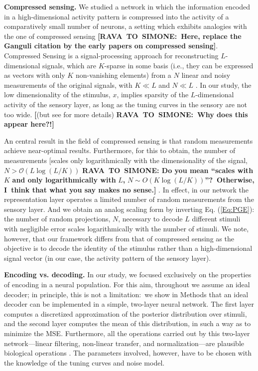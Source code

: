\documentclass[a4paper]{article}%
\begin{document}
\textbf{Compressed sensing.} We studied a network in which the information
encoded in a high-dimensional activity pattern is compressed into the activity
of a comparatively small number of neurons, a setting which exhibits analogies
with the one of compressed sensing \textbf{[RAVA\ TO\ SIMONE:\ Here, replace
the Ganguli citation by the early papers on compressed sensing]}. Compressed
Sensing is a signal-processing approach for reconstructing $L$-dimensional
signals, which are $K$-sparse in some basis (i.e., they can be expressed as
vectors with only $K$ non-vanishing elements) from a $N$ linear and noisy
measurements of the original signals, with $K\ll L$ and $N\ll L$
\cite{Donoho2006CompressedSensing}. In our study, the low dimensionality of
the stimulus, $x$, implies sparsity of the $L$-dimensional activity of the
sensory layer, as long as the tuning curves in the sensory are not too wide.
\textbf{[}(but see \cite{Baraniuk2009RandomManifolds} for more details)
\textbf{RAVA\ TO\ SIMONE:\ Why does this appear here?!]} 

An central result in the field of compressed sensing is that random
measurements achieve near-optimal results. Furthermore, for this to obtain,
the number of measurements [scales only logarithmically with the
dimensionality of the signal, $N>\mathcal{O}\left(  L\log\left(  L/K\right)
\right)  $ \textbf{RAVA\ TO\ SIMONE: Do you mean \textquotedblleft scales with
}$K$\textbf{ and only logarithmically with }$L$\textbf{, }$N\sim O\left(
K\log\left(  L/K\right)  \right)  $\textbf{\textquotedblright?\ Otherwise,
I\ think that what you say makes no sense.] }%
\cite{Candes2006Near-optimalStrategies,Baraniuk2008AMatrices}. In effect, in
our network the representation layer operates a limited number of random
measurements from the sensory layer. And we obtain an analog scaling form by
inverting Eq. (\ref{Eq:PGE}): the number of random projections, $N$, necessary
to decode $L$ different stimuli with negligible error scales logarithmically
with the number of stimuli. We note, however, that our framework differs from
that of compressed sensing as the objective is to decode the identity of the
stimulus rather than a high-dimensional signal vector (in our case, the
activity pattern of the sensory layer).

\textbf{Encoding vs. decoding.} In our study, we focused exclusively on the
properties of encoding in a neural population. For this aim, throughout we
assume an ideal decoder; in principle, this is not a limitation:\ we show in
Methods that an ideal decoder can be implemented in a simple, two-layer neural
network. The first layer computes a discretized approximation of the posterior
distribution over stimuli, and the second layer computes the mean of this
distribution, in such a way as to minimize the MSE. Furthermore, all the
operations carried out by this two-layer network---linear filtering,
non-linear transfer, and normalization---are plausible biological operations
\cite{Deneve1999ReadingObservers,Kouh2008AOperations,Carandini2012NormalizationComputation}%
. The parameters involved, however, have to be chosen with the knowledge of
the tuning curves and noise model.
\end{document}
